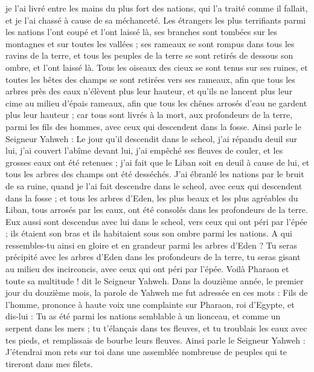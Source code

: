 \begin{multicols}{2}
je l'ai livré entre les mains du plus fort des nations, qui l'a traité comme il fallait, et je l'ai chassé à cause de sa méchanceté.
Les étrangers les plus terrifiants parmi les nations l'ont coupé et l'ont laissé là, ses branches sont tombées sur les montagnes et sur toutes les vallées ; ses rameaux se sont rompus dans tous les ravins de la terre, et tous les peuples de la terre se sont retirés de dessous son ombre, et l'ont laissé là.
Tous les oiseaux des cieux se sont tenus sur ses ruines, et toutes les bêtes des champs se sont retirées vers ses rameaux,
afin que tous les arbres près des eaux n'élèvent plus leur hauteur, et qu'ils ne lancent plus leur cime au milieu d'épais rameaux, afin que tous les chênes arrosés d'eau ne gardent plus leur hauteur ; car tous sont livrés à la mort, aux profondeurs de la terre, parmi les fils des hommes, avec ceux qui descendent dans la fosse.
Ainsi parle le Seigneur Yahweh : Le jour qu'il descendit dans le scheol, j'ai répandu deuil sur lui, j'ai couvert l'abîme devant lui, j'ai empêché ses fleuves de couler, et les grosses eaux ont été retenues ; j'ai fait que le Liban soit en deuil à cause de lui, et tous les arbres des champs ont été desséchés.
J'ai ébranlé les nations par le bruit de sa ruine, quand je l'ai fait descendre dans le scheol, avec ceux qui descendent dans la fosse ; et tous les arbres d'Eden, les plus beaux et les plus agréables du Liban, tous arrosés par les eaux, ont été consolés dans les profondeurs de la terre.
Eux aussi sont descendus avec lui dans le scheol, vers ceux qui ont péri par l'épée ; ils étaient son bras et ils habitaient sous son ombre parmi les nations.
A qui ressembles-tu ainsi en gloire et en grandeur parmi les arbres d'Eden ? Tu seras précipité avec les arbres d'Eden dans les profondeurs de la terre, tu seras gisant au milieu des incirconcis, avec ceux qui ont péri par l'épée. Voilà Pharaon et toute sa multitude ! dit le Seigneur Yahweh.
\VerseOne{}Dans la douzième année, le premier jour du douzième mois, la parole de Yahweh me fut adressée en ces mots :
Fils de l'homme, prononce à haute voix une complainte sur Pharaon, roi d'Egypte, et dis-lui : Tu as été parmi les nations semblable à un lionceau, et comme un serpent dans les mers ; tu t'élançais dans tes fleuves, et tu troublais les eaux avec tes pieds, et remplissais de bourbe leurs fleuves.
Ainsi parle le Seigneur Yahweh : J'étendrai mon rets sur toi dans une assemblée nombreuse de peuples qui te tireront dans mes filets.

\end{multicols}

